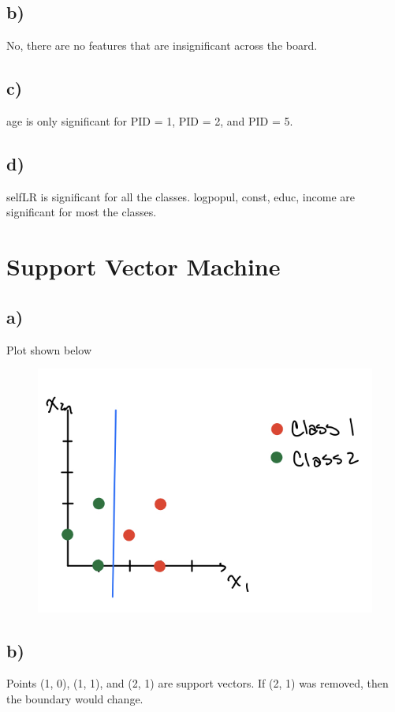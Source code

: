 \documentclass[12pt, letterpaper]{article}
\begin{document}
\subsection*{b)} No, there are no features that are insignificant across the board.

\subsection*{c)} age is only significant for PID = 1, PID = 2, and PID = 5.

\subsection*{d)} selfLR is significant for all the classes. logpopul, const, educ, income are significant for most the classes.

\newpage
\section{Support Vector Machine}
\subsection*{a)} Plot shown below
\FloatBarrier
\begin{figure}[h!]
  \includegraphics[scale=0.33]{./images/8a.jpg}
\end{figure}

\subsection*{b)} Points (1, 0), (1, 1), and (2, 1) are support vectors. If (2, 1) was removed, then the boundary would change.
\end{document}
